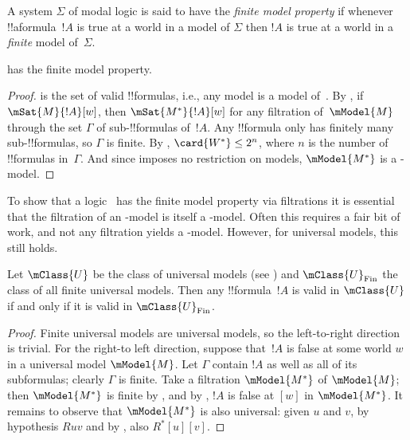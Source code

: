 \documentclass[../../../include/open-logic-section]{subfiles}
\begin{document}


\begin{defn}
  A system $\Sigma$ of modal logic is said to have the \emph{finite
    model property} if whenever !!a{formula}~$!A$ is true at a world
  in a model of $\Sigma$ then $!A$ is true at a world in a
  \emph{finite} model of~$\Sigma$.
\end{defn}

\begin{prop}
   has the finite model property.
\end{prop}

\begin{proof}
   is the set of valid !!{formula}s, i.e., any model is a model
  of~.  By , if
  $\mSat{M}{!A}[w]$, then $\mSat{M^*}{!A}[w]$ for any filtration
  of~$\mModel{M}$ through the set $\Gamma$ of sub-!!{formula}s
  of~$!A$. Any !!{formula} only has finitely many sub-!!{formula}s, so
  $\Gamma$ is finite. By ,
  $\card{W^*} \le 2^n$, where $n$ is the number of !!{formula}s
  in~$\Gamma$. And since  imposes no restriction on models,
  $\mModel{M^*}$ is a -model.
\end{proof}

To show that a logic~ has the finite model property via
filtrations it is essential that the filtration of an -model is
itself a -model. Often this requires a fair bit of work, and
not any filtration yields a -model. However, for universal
models, this still holds.

\begin{prop}
  Let $\mClass{U}$ be the class of universal models (see
  ) and $\mClass{U}_\mathrm{Fin}$ the
  class of all finite universal models. Then any !!{formula}~$!A$ is
  valid in $\mClass{U}$ if and only if it is valid in
  $\mClass{U}_\mathrm{Fin}$.
\end{prop}

\begin{proof}
  Finite universal models are universal models, so the left-to-right
  direction is trivial. For the right-to left direction, suppose
  that~$!A$ is false at some world $w$ in a universal model
  $\mModel{M}$. Let $\Gamma$ contain $!A$ as well as all of its
  subformulas; clearly $\Gamma$ is finite. Take a filtration
  $\mModel{M^*}$ of $\mModel{M}$; then $\mModel{M^*}$ is finite by
  , and by
  , $!A$ is false at $[w]$ in
  $\mModel{M^*}$. It remains to observe that $\mModel{M^*}$ is also
  universal: given $u$ and $v$, by hypothesis $Ruv$ and by
  ,
  also $R^*[u][v]$.
\end{proof}
\end{document}
